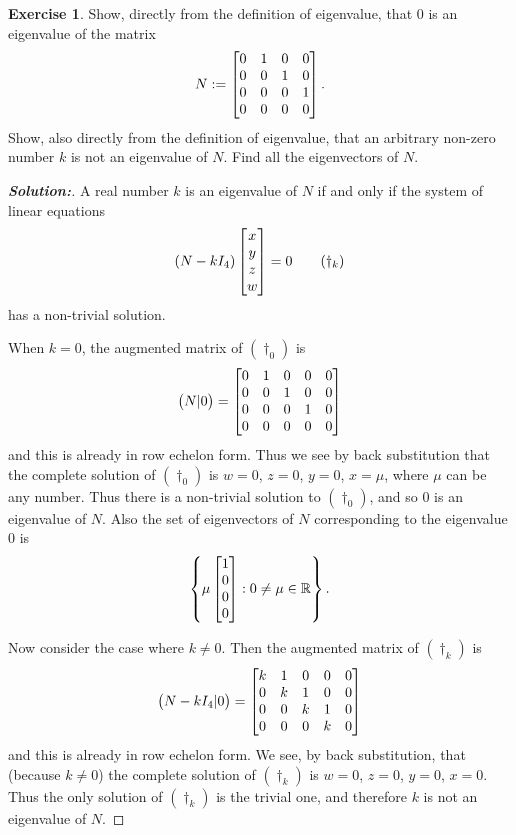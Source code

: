 \documentclass[a4paper]{amsart}
\theoremstyle{definition}
\newtheorem{exercise}{Exercise}
\newenvironment{solution}{\begin{proof}[\textbf{Solution:}] \vphantom{u}}{\end{proof}}
\begin{document}
\begin{exercise}\label{ex-evectors-iii}
 Show, directly from the definition of eigenvalue, that 0 is an eigenvalue
 of the matrix
 \[ N := \left[\begin{matrix} 
          0 & 1 & 0 & 0 \\
          0 & 0 & 1 & 0 \\
          0 & 0 & 0 & 1 \\
          0 & 0 & 0 & 0
         \end{matrix}\right].
 \]
 Show, also directly from the definition of eigenvalue, that an arbitrary non-zero
 number $k$ is not an eigenvalue of $N$.
 Find all the eigenvectors of $N$.
\end{exercise}
\begin{solution}
 A real number $k$ is an eigenvalue of $N$ if and only if the
 system of linear equations \[(N-kI_4)\left[\begin{matrix}
 x\\y\\z\\w\end{matrix}\right] = 0 \tag{$\dagger_k$}\] has a non-trivial
 solution.

 When $k = 0$, the augmented matrix of $(\dagger_0)$ is
 $$\big(N|0\big)= \left[\begin{matrix}
 0&1&0&0&0\\0&0&1&0&0\\0&0&0&1&0\\0&0&0&0&0\end{matrix}\right]$$ and this
 is already in row echelon form. Thus we see by back substitution
 that the complete solution of $(\dagger_0)$ is $w = 0$, $z = 0$,
 $y= 0$, $x = \mu$, where $\mu$ can be any number. Thus there is a
 non-trivial solution to $(\dagger_0)$, and so $0$ is an eigenvalue
 of $N$. Also the set of eigenvectors of $N$ corresponding to the
 eigenvalue $0$ is
 $$
 \left\{ \mu\left[\begin{matrix} 1\\0\\0\\0\end{matrix}\right] : 0 \neq \mu
 \in {\mathbb{R}} \right\}.
 $$

 Now consider the case where $k \neq 0$. Then the augmented matrix
 of $(\dagger_k)$ is $$\big(N-kI_4|0\big) = \left[\begin{matrix}
 k&1&0&0&0\\0&k&1&0&0\\0&0&k&1&0\\0&0&0&k&0\end{matrix}\right]$$ and this
 is already in row echelon form. We see, by back substitution, that
 (because $k \neq 0$) the complete solution of $(\dagger_k)$ is $w
 = 0$, $z = 0$, $y = 0$, $x=0$. Thus the only solution of
 $(\dagger_k)$ is the trivial one, and therefore $k$ is not an
 eigenvalue of $N$.
\end{solution}
\end{document}
